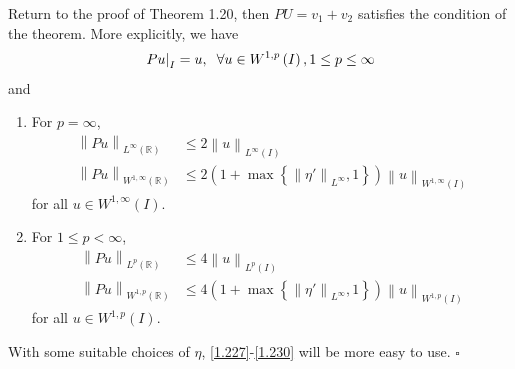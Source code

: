 \documentclass[a4paper,oneside]{book}
\numberwithin{equation}{chapter}
\begin{document}
Return to the proof of Theorem 1.20, then $PU=v_1 +v_2$ satisfies the condition of the theorem. More explicitly, we have
\begin{align}
{\left. {Pu} \right|_I} = u,\hspace{0.2cm}\forall u \in {W^{1,p}}\left( I \right),1 \le p \le \infty 
\end{align}
and
\begin{enumerate}
\item For $p=\infty$, 
\begin{align}
\label{1.227}
{\left\| {Pu} \right\|_{{L^\infty }\left( \mathbb{R} \right)}} &\le 2{\left\| u \right\|_{{L^\infty }\left( I \right)}}\\
{\left\| {Pu} \right\|_{{W^{1,\infty }}\left( \mathbb{R} \right)}} &\le 2\left( {1 + \max \left\{ {{{\left\| {\eta '} \right\|}_{{L^\infty }}},1} \right\}} \right){\left\| u \right\|_{{W^{1,\infty }}\left( I \right)}}
\end{align}
for all $u \in {W^{1,\infty }}\left( I \right)$.
\item For $1\le p<\infty$,
\begin{align}
{\left\| {Pu} \right\|_{{L^p}\left( \mathbb{R} \right)}} &\le 4{\left\| u \right\|_{{L^p}\left( I \right)}}\\
{\left\| {Pu} \right\|_{{W^{1,p}}\left( \mathbb{R} \right)}} &\le 4\left( {1 + \max \left\{ {{{\left\| {\eta '} \right\|}_{{L^\infty }}},1} \right\}} \right){\left\| u \right\|_{{W^{1,p}}\left( I \right)}} \label{1.230}
\end{align}
for all $u \in {W^{1,p}}\left( I \right)$. 
\end{enumerate}
With some suitable choices of $\eta$, \eqref{1.227}-\eqref{1.230} will be more easy to use. \hfill $\square$\\
\end{document}
